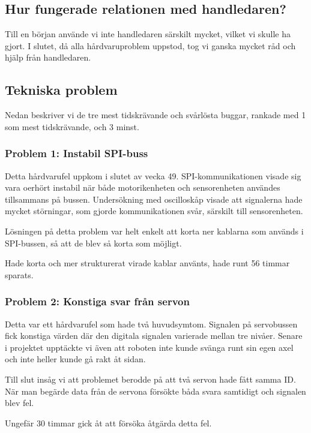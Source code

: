 \documentclass[a4paper,titlepage,12pt]{article}
\begin{document}
	\subsection{Hur fungerade relationen med handledaren?}
    Till en början använde vi inte handledaren särskilt mycket, vilket vi
    skulle ha gjort. I slutet, då alla hårdvaruproblem uppstod, tog vi ganska
    mycket råd och hjälp från handledaren.
	
	\subsection{Tekniska problem}

    Nedan beskriver vi de tre mest tidskrävande och svårlösta buggar, rankade
    med 1 som mest tidskrävande, och 3 minst.

    \subsubsection{Problem 1: Instabil SPI-buss}

    Detta hårdvarufel uppkom i slutet av vecka 49. SPI-kommunikationen visade
    sig vara oerhört instabil när både motorikenheten och sensorenheten
    användes tillsammans på bussen. Undersökning med oscilloskåp visade att
    signalerna hade mycket störningar, som gjorde kommunikationen svår,
    särskilt till sensorenheten.

    Lösningen på detta problem var helt enkelt att korta ner kablarna som
    används i SPI-bussen, så att de blev så korta som möjligt.

    Hade korta och mer strukturerat virade kablar använts, hade runt 56 timmar
    sparats. %

    \subsubsection{Problem 2: Konstiga svar från servon}

    Detta var ett hårdvarufel som hade två huvudsymtom. Signalen på servobussen fick 
	konstiga värden där den digitala signalen varierade mellan tre nivåer. Senare i 
	projektet upptäckte vi även att roboten inte kunde svänga runt sin egen axel och
	inte heller kunde gå rakt åt sidan. 
	
	Till slut insåg vi att problemet berodde på att två servon hade fått samma ID. 
	När man begärde data från de servona försökte båda svara samtidigt och signalen
	blev fel.

    Ungefär 30 timmar gick åt att försöka åtgärda detta fel.
\end{document}
